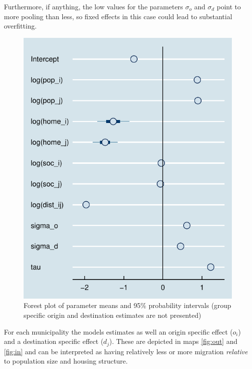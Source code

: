 \documentclass[fleqn,10pt]{SelfArx} %
\begin{document}
{{Furthermore, if anything, the low values for the parameters $\sigma_o$ and $\sigma_d$ point to more
pooling than less, so fixed effects in this case could lead to
substantial overfitting. 

\begin{figure}
  \includegraphics[width = \columnwidth]{../fig/forestplot.pdf}
  \caption{Forest plot of parameter means and 95\% probability
    intervals (group specific origin and destination estimates are not
    presented)}
  \label{fig:forestplot}
\end{figure}

For each municipality the models estimates as well an origin specific effect ($o_i$) and a destination specific effect ($d_j$). These are depicted in maps \ref{fig:out} and \ref{fig:in} and can be interpreted as having relatively less or more migration \emph{relative} to population size and housing structure.

}}
\end{document}

